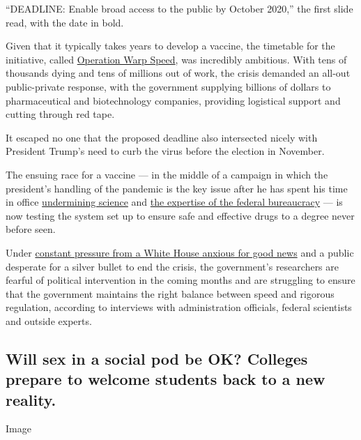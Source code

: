 ``DEADLINE: Enable broad access to the public by October 2020,'' the
first slide read, with the date in bold.

Given that it typically takes years to develop a vaccine, the timetable
for the initiative, called
\href{https://www.nytimes3xbfgragh.onion/2020/04/29/us/politics/trump-coronavirus-vaccine-operation-warp-speed.html}{Operation
Warp Speed}, was incredibly ambitious. With tens of thousands dying and
tens of millions out of work, the crisis demanded an all-out
public-private response, with the government supplying billions of
dollars to pharmaceutical and biotechnology companies, providing
logistical support and cutting through red tape.

It escaped no one that the proposed deadline also intersected nicely
with President Trump's need to curb the virus before the election in
November.

The ensuing race for a vaccine --- in the middle of a campaign in which
the president's handling of the pandemic is the key issue after he has
spent his time in office
\href{https://www.nytimes3xbfgragh.onion/2020/04/28/climate/trump-coronavirus-climate-science.html}{undermining
science} and
\href{https://www.nytimes3xbfgragh.onion/2020/07/09/climate/trump-hurricane-dorian-noaa.html}{the
expertise of the federal bureaucracy} --- is now testing the system set
up to ensure safe and effective drugs to a degree never before seen.

Under
\href{https://www.nytimes3xbfgragh.onion/2020/08/02/us/politics/coronavirus-vaccine.html}{constant
pressure from a White House anxious for good news} and a public
desperate for a silver bullet to end the crisis, the government's
researchers are fearful of political intervention in the coming months
and are struggling to ensure that the government maintains the right
balance between speed and rigorous regulation, according to interviews
with administration officials, federal scientists and outside experts.

\hypertarget{will-sex-in-a-social-pod-be-ok-colleges-prepare-to-welcome-students-back-to-a-new-reality}{%
\subsection{Will sex in a social pod be OK? Colleges prepare to welcome
students back to a new
reality.}\label{will-sex-in-a-social-pod-be-ok-colleges-prepare-to-welcome-students-back-to-a-new-reality}}

Image

